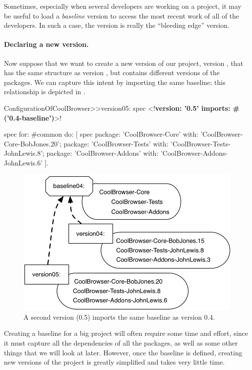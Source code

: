 \documentclass[a4paper,10pt,twoside]{book}
\begin{document}
Sometimes, especially when several developers are working on a project, it may be useful to load a \emph{baseline} version to access the most recent work of all of the developers.  In such a case, the  version is really the ``bleeding edge'' version.

\paragraph{Declaring a new version.}
Now suppose that we want to create a new version of our project, version , that has the same structure as version , but contains different  versions of the packages.  We can capture this intent by importing the same baseline; this relationship is depicted in .


\begin{code}{} 
ConfigurationOfCoolBrowser>>version05: spec 
       <!\textbf{version: '0.5' imports: \#('0.4-baseline')}>!
       
      spec for: #common do: [
            spec 
                  package: 'CoolBrowser-Core' with: 'CoolBrowser-Core-BobJones.20';
                  package: 'CoolBrowser-Tests' with: 'CoolBrowser-Tests-JohnLewis.8';
                  package: 'CoolBrowser-Addons' with: 'CoolBrowser-Addons-JohnLewis.6' ].
\end{code}

\begin{figure}
\begin{center}
\includegraphics[width=0.6\linewidth]{version05}
\caption{A second version (0.5) imports the same baseline as version 0.4.}\label{fig:version05}
\end{center}
\end{figure} 

Creating a baseline for a big project will often require some time and effort, since it must capture all the dependencies of all the packages, as well as some other things that we will look at later.
However, once the baseline is defined, creating new versions of the project is greatly simplified and takes very little time. 
\end{document}
